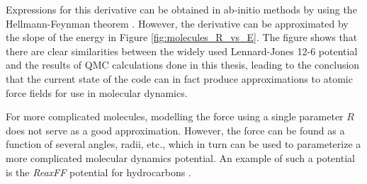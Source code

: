 Expressions for this derivative can be obtained in ab-initio methods by using the Hellmann-Feynman theorem \cite{forcesQMC}. However, the derivative can be approximated by the slope of the energy in Figure \ref{fig:molecules_R_vs_E}. The figure shows that there are clear similarities between the widely used Lennard-Jones 12-6 potential and the results of QMC calculations done in this thesis, leading to the conclusion that the current state of the code can in fact produce approximations to atomic force fields for use in molecular dynamics.

For more complicated molecules, modelling the force using a single parameter $R$ does not serve as a good approximation. However, the force can be found as a function of several angles, radii, etc., which in turn can be used to parameterize a more complicated molecular dynamics potential. An example of such a potential is the \textit{ReaxFF} potential for hydrocarbons \cite{ReaxFF}.
